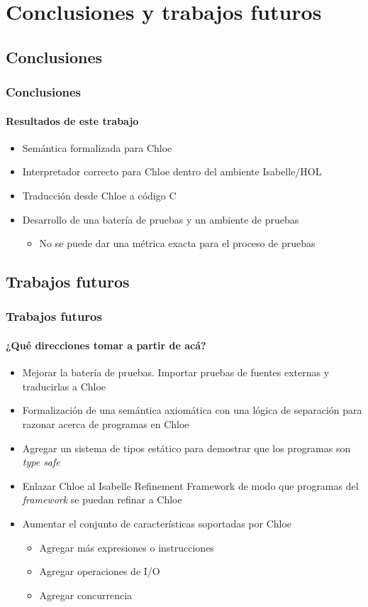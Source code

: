 \section{Conclusiones y trabajos futuros}


\subsection{Conclusiones}


\begin{frame}
\frametitle{Conclusiones}
\framesubtitle{Resultados de este trabajo}

\begin{itemize}
\item{Semántica formalizada para Chloe}
\item{Interpretador correcto para Chloe dentro del ambiente Isabelle/HOL}
\item{Traducción desde Chloe a código C}
\item{Desarrollo de una batería de pruebas y un ambiente de pruebas}
\begin{itemize}
\item{No se puede dar una métrica exacta para el proceso de pruebas}
\end{itemize}
\end{itemize}

\end{frame}


\subsection{Trabajos futuros}


\begin{frame}
\frametitle{Trabajos futuros}
\framesubtitle{¿Qué direcciones tomar a partir de acá?}

\begin{itemize}
\item{Mejorar la batería de pruebas. Importar pruebas de fuentes externas y traducirlas a Chloe}
\item{Formalización de una semántica axiomática con una lógica de separación para razonar acerca de programas en Chloe}
\item{Agregar un sistema de tipos estático para demostrar que los programas son \textit{type safe}}
\item{Enlazar Chloe al Isabelle Refinement Framework de modo que programas del \textit{framework} se puedan refinar a Chloe}
\item{Aumentar el conjunto de características soportadas por Chloe}
\begin{itemize}
\item{Agregar más expresiones o instrucciones}
\item{Agregar operaciones de I/O}
\item{Agregar concurrencia}
\end{itemize}
\end{itemize}


\end{frame}
